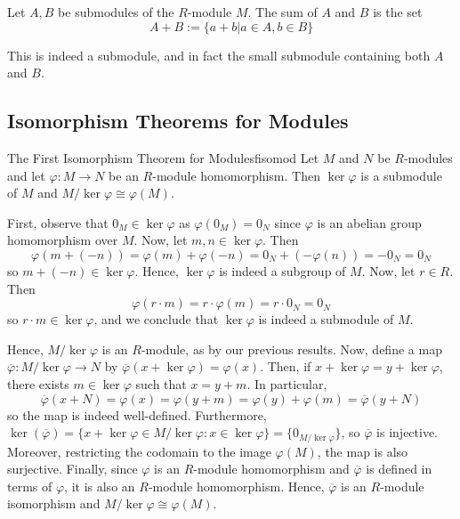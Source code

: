 \documentclass[12pt, a4paper, twoside, openright, titlepage]{book}
\begin{document}
\begin{defn}{}{}
    Let $A,B$ be submodules of the $R$-module $M$. The sum of $A$ and $B$ is the set \begin{equation*}
        A+B := \{a+b\vert a\in A, b \in B\}
    \end{equation*}
\end{defn}

This is indeed a submodule, and in fact the small submodule containing both $A$ and $B$.

\subsection{\textsection Isomorphism Theorems for Modules}

\begin{namthm}{The First Isomorphism Theorem for Modules}{fisomod}
    Let $M$ and $N$ be $R$-modules and let $\varphi:M\rightarrow N$ be an $R$-module homomorphism. Then $\ker\varphi$ is a submodule of $M$ and $M/\ker\varphi\cong \varphi(M)$.
\end{namthm}
\begin{proof*}{}{}
    First, observe that $0_M \in \ker \varphi$ as $\varphi(0_M) = 0_N$ since $\varphi$ is an abelian group homomorphism over $M$. Now, let $m,n \in \ker\varphi$. Then \begin{equation*}
        \varphi(m+(-n)) = \varphi(m)+\varphi(-n) = 0_N+(-\varphi(n)) = -0_N = 0_N
    \end{equation*}
    so $m+(-n) \in \ker\varphi$. Hence, $\ker\varphi$ is indeed a subgroup of $M$. Now, let $r \in R$. Then $$\varphi(r\cdot m) = r\cdot \varphi(m) = r\cdot 0_N = 0_N$$
    so $r\cdot m \in \ker\varphi$, and we conclude that $\ker\varphi$ is indeed a submodule of $M$.

    Hence, $M/\ker\varphi$ is an $R$-module, as by our previous results. Now, define a map $\overline{\varphi}:M/\ker\varphi\rightarrow N$ by $\overline{\varphi}(x+\ker\varphi) = \varphi(x)$. Then, if $x+\ker\varphi = y + \ker\varphi$, there exists $m \in \ker\varphi$ such that $x= y + m$. In particular, \begin{equation*}
        \overline{\varphi}(x+N) = \varphi(x) = \varphi(y+m) = \varphi(y)+\varphi(m)= \overline{\varphi}(y+N)
    \end{equation*}
    so the map is indeed well-defined. Furthermore, $\ker(\overline{\varphi}) = \{x+\ker\varphi\in M/\ker\varphi:x \in \ker\varphi\} = \{0_{M/\ker\varphi}\}$, so $\overline{\varphi}$ is injective. Moreover, restricting the codomain to the image $\varphi(M)$, the map is also surjective. Finally, since $\varphi$ is an $R$-module homomorphism and $\overline{\varphi}$ is defined in terms of $\varphi$, it is also an $R$-module homomorphism. Hence, $\overline{\varphi}$ is an $R$-module isomorphism and $M/\ker\varphi\cong\varphi(M)$. 
\end{proof*}
\end{document}
